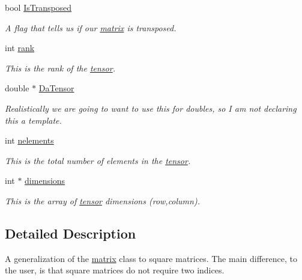 \begin{DoxyCompactItemize}
\item 
bool \hyperlink{classJKBuilder_1_1matrix_a77fa48e57c519482de2ec7ec182b16ef}{IsTransposed}
\begin{DoxyCompactList}\small\item\em A flag that tells us if our \hyperlink{classJKBuilder_1_1matrix}{matrix} is transposed. \item\end{DoxyCompactList}\item 
int \hyperlink{classJKBuilder_1_1tensor_a6cfd95afd0afebd625b889fb6e58371c}{rank}
\begin{DoxyCompactList}\small\item\em This is the rank of the \hyperlink{classJKBuilder_1_1tensor}{tensor}. \item\end{DoxyCompactList}\item 
double $\ast$ \hyperlink{classJKBuilder_1_1tensor_a91f7b1e58c0e5d1a49ddb8b80ab7790e}{DaTensor}
\begin{DoxyCompactList}\small\item\em Realistically we are going to want to use this for doubles, so I am not declaring this a template. \item\end{DoxyCompactList}\item 
int \hyperlink{classJKBuilder_1_1tensor_a23ae6a00bed19d2ad34d439636e797da}{nelements}
\begin{DoxyCompactList}\small\item\em This is the total number of elements in the \hyperlink{classJKBuilder_1_1tensor}{tensor}. \item\end{DoxyCompactList}\item 
int $\ast$ \hyperlink{classJKBuilder_1_1tensor_a2ce1e6e0782ddee097f2c4aa2663d3e9}{dimensions}
\begin{DoxyCompactList}\small\item\em This is the array of \hyperlink{classJKBuilder_1_1tensor}{tensor} dimensions (row,column). \item\end{DoxyCompactList}\end{DoxyCompactItemize}


\subsection{Detailed Description}
A generalization of the \hyperlink{classJKBuilder_1_1matrix}{matrix} class to square matrices. The main difference, to the user, is that square matrices do not require two indices. 

